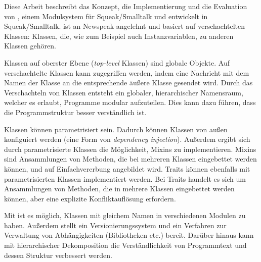 \begin{zusammenfassung}
Diese Arbeit beschreibt das Konzept, die Implementierung und die Evaluation von \msname, einem Modulsystem für Squeak/Smalltalk und entwickelt in Squeak/Smalltalk. \msname ist an Newspeak angelehnt und basiert auf verschachtelten Klassen: Klassen, die, wie zum Beispiel auch Instanzvariablen, zu anderen Klassen gehören.

Klassen auf oberster Ebene (\emph{top-level} Klassen) sind globale Objekte. Auf verschachtelte Klassen kann zugegriffen werden, indem eine Nachricht mit dem Namen der Klasse an die entsprechende äußere Klasse gesendet wird. Durch das Verschachteln von Klassen entsteht ein globaler, hierarchischer Namensraum, welcher es erlaubt, Programme modular aufzuteilen. Dies kann dazu führen, dass die Programmstruktur besser verständlich ist.

Klassen können parametrisiert sein. Dadurch können Klassen von außen konfiguiert werden (eine Form von \emph{dependency injection}). Außerdem ergibt sich durch parametrisierte Klassen die Möglichkeit, Mixins zu implementieren. Mixins sind Ansammlungen von Methoden, die bei mehreren Klassen eingebettet werden können, und auf Einfachvererbung angebildet wird. Traits können ebenfalls mit parametrisierten Klassen implementiert werden. Bei Traits handelt es sich um Ansammlungen von Methoden, die in mehrere Klassen eingebettet werden können, aber eine explizite Konfliktauflösung erfordern.

Mit \msname ist es möglich, Klassen mit gleichem Namen in verschiedenen Modulen zu haben. Außerdem stellt \msname ein Versionierungssystem und ein Verfahren zur Verwaltung  von Abhängigkeiten (Bibliotheken etc.) bereit. Darüber hinaus kann mit hierarchischer Dekomposition die Verständlichkeit von Programmtext und dessen Struktur verbessert werden.
\end{zusammenfassung}

